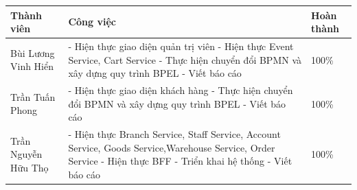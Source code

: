 {
\setlength\extrarowheight{6pt}
\begin{longtable}{| p{4.5cm} | p{8cm} | p{2.5cm} |}

    \hline
    \textbf{Thành viên} & \textbf{Công việc}                                                                                         & \textbf{Hoàn thành} \\
    \hline
    Bùi Lương Vinh Hiển & - Hiện thực giao diện quản trị viên
    \newline
    - Hiện thực Event Service, Cart Service
    \newline
    - Thực hiện chuyển đổi BPMN và xây dựng quy trình BPEL
    \newline
    - Viết báo cáo      &
    100\%                                                                                                                                                  \\
    \hline
    Trần Tuấn Phong     & - Hiện thực giao diện khách hàng
    \newline
    - Thực hiện chuyển đổi BPMN và xây dựng quy trình BPEL
    \newline
    - Viết báo cáo      &
    100\%                                                                                                                                                  \\
    \hline
    Trần Nguyễn Hữu Thọ & - Hiện thực Branch Service, Staff Service, Account Service, Goods Service,Warehouse Service, Order Service
    \newline
    - Hiện thực BFF
    \newline
    - Triển khai hệ thống
    \newline
    - Viết báo cáo      &
    100\%                                                                                                                                                  \\
    \hline
\end{longtable}

}